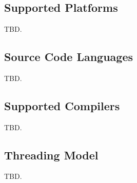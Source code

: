 \chapter{\ctfezerotitle{}}

\label{ctfe0}

\section{Supported Platforms}
\label{ctfe0:sspf0}

TBD.


\section{Source Code Languages}
\label{ctfe0:sscl0}

TBD.


\section{Supported Compilers}
\label{ctfe0:sscp0}

TBD.


\section{Threading Model}
\label{ctfe0:stmd0}

TBD.


